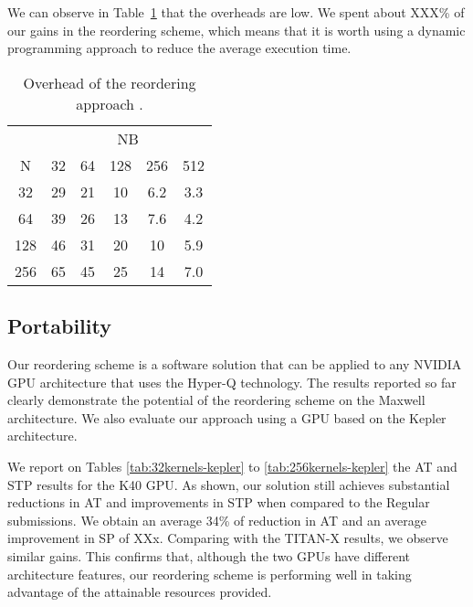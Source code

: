 \documentclass[conference]{IEEEtran}
\begin{document}

We can observe in Table~\ref{tab:overhead} that the overheads are low. We spent about XXX\% of our gains in the reordering scheme, which means that it is worth using a dynamic programming approach to reduce the average execution time. 

\begin{table}[htb]
    \centering
    \begin{tabular}{|c|c|c|c|c|c|} \hline
      & \multicolumn{5}{|c|}{NB}     \\ \cline{2-6}
 N    & 32  & 64  & 128  & 256 & 512 \\ \hline
 32   & 29  & 21  & 10   & 6.2 & 3.3 \\ \hline
 64   & 39  & 26  & 13   & 7.6 & 4.2 \\ \hline
 128  & 46  & 31  & 20   & 10  & 5.9 \\ \hline
 256  & 65  & 45  & 25   & 14  & 7.0 \\ \hline

    \end{tabular}
    \caption{Overhead of the reordering approach .}
    \label{tab:overhead}
\end{table}

\subsection{Portability}

Our reordering scheme is a software solution that can be applied to any NVIDIA GPU architecture that uses the Hyper-Q technology. The results reported so far clearly demonstrate the potential of the reordering scheme on the Maxwell architecture. We also evaluate our approach using a GPU based on the Kepler architecture. 

We report on Tables \ref{tab:32kernels-kepler} to \ref{tab:256kernels-kepler} the AT and STP results for the K40 GPU. As shown, our solution still achieves substantial reductions in AT and improvements in STP when compared to the Regular submissions. We obtain an average 34\% of reduction in AT and an average improvement in SP of XXx. Comparing with the TITAN-X results, we observe similar gains. This confirms that, although the two GPUs have different architecture features, our reordering scheme is performing well in taking advantage of the attainable resources provided.
 
\end{document}
